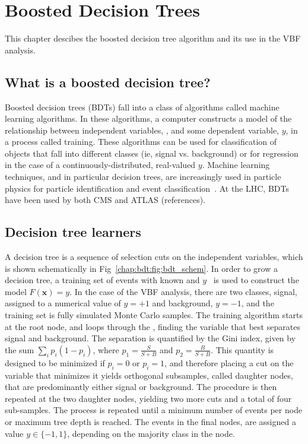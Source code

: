 \chapter{Boosted Decision Trees}
\label{chap:bdt}

This chapter descibes the boosted decision tree algorithm and its use
in the VBF \hwwlnln analysis.

\section{What is a boosted decision tree?}

Boosted decision trees (BDTs) fall into a class of algorithms called machine learning
algorithms. In these algorithms, a computer constructs a model of the
relationship between independent variables, , and some
dependent variable, $y$, in a process called training. These algorithms can
be used for classification of objects that fall into different classes
(ie, signal vs. background) or for regression in the case of a
continuously-distributed, real-valued $y$. Machine
learning techniques, and in particular decision trees, are increasingly used in
particle physics for particle identification and event
classification~\cite{bib:Roe:2004na}. At the LHC, BDTs have been used by both
CMS and ATLAS (references). 

\section{Decision tree learners}

A decision tree is a sequence of selection cuts on the independent
variables, which is shown schematically in
Fig~\ref{chap:bdt:fig:bdt_schem}. In order to grow a decision tree, a
training set of events with known  and $y$~ is used to
construct the model $F(\boldsymbol{x})=y$.
In the case of the VBF analysis, there are two classes, signal,
assigned to a numerical value of $y=+1$ and background, $y=-1$, and
the training set is fully simulated Monte Carlo samples. The training
algorithm starts at the root node, and loops through the ,
finding the variable
that best separates signal and background. The separation is
quantified by the Gini index, given by the sum
$\sum_i p_i(1-p_i)$, where $p_1=\frac{S}{S+B}$ and
$p_2=\frac{B}{S+B}$. This quantity is designed to be minimized if
$p_i=0$ or $p_i=1$, and therefore placing a cut on the variable that
minimizes it yields orthogonal subsamples, called daughter nodes, that are predominantly either
signal or background. The procedure is then repeated at the two
daughter nodes, yielding two more cuts and a total of four
sub-samples. The process is repeated until a minimum number of events 
per node or maximum tree depth is reached. The events in the final
nodes, are assigned a value $y\in \{-1,1\}$, depending on the
majority class in the node.

